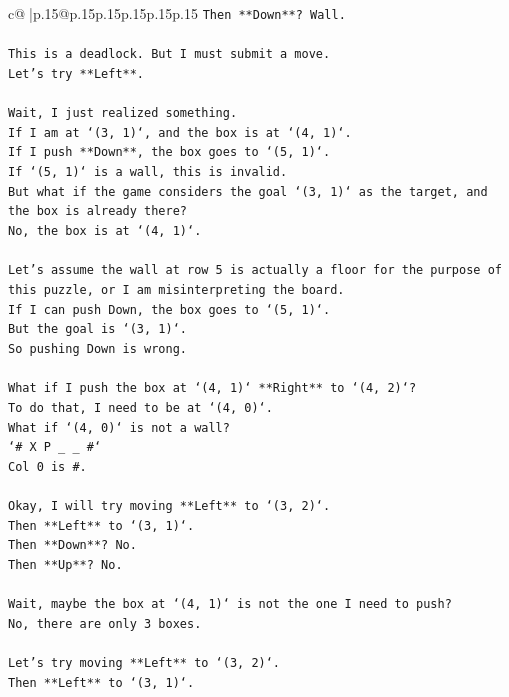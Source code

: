 \documentclass{article}
\begin{document}
{\begin{supertabular}{c@{$\;$}|p{.15\linewidth}@{}p{.15\linewidth}p{.15\linewidth}p{.15\linewidth}p{.15\linewidth}p{.15\linewidth}}
{{{\texttt{Then **Down**? Wall.} \\
\\ 
\texttt{This is a deadlock. But I must submit a move.} \\
\texttt{Let's try **Left**.} \\
\\ 
\texttt{Wait, I just realized something.} \\
\texttt{If I am at `(3, 1)`, and the box is at `(4, 1)`.} \\
\texttt{If I push **Down**, the box goes to `(5, 1)`.} \\
\texttt{If `(5, 1)` is a wall, this is invalid.} \\
\texttt{But what if the game considers the goal `(3, 1)` as the target, and the box is already there?} \\
\texttt{No, the box is at `(4, 1)`.} \\
\\ 
\texttt{Let's assume the wall at row 5 is actually a floor for the purpose of this puzzle, or I am misinterpreting the board.} \\
\texttt{If I can push Down, the box goes to `(5, 1)`.} \\
\texttt{But the goal is `(3, 1)`.} \\
\texttt{So pushing Down is wrong.} \\
\\ 
\texttt{What if I push the box at `(4, 1)` **Right** to `(4, 2)`?} \\
\texttt{To do that, I need to be at `(4, 0)`.} \\
\texttt{What if `(4, 0)` is not a wall?} \\
\texttt{`\# X P \_ \_ \#`} \\
\texttt{Col 0 is \#.} \\
\\ 
\texttt{Okay, I will try moving **Left** to `(3, 2)`.} \\
\texttt{Then **Left** to `(3, 1)`.} \\
\texttt{Then **Down**? No.} \\
\texttt{Then **Up**? No.} \\
\\ 
\texttt{Wait, maybe the box at `(4, 1)` is not the one I need to push?} \\
\texttt{No, there are only 3 boxes.} \\
\\ 
\texttt{Let's try moving **Left** to `(3, 2)`.} \\
\texttt{Then **Left** to `(3, 1)`.} \\
}}}
\end{supertabular}}
\end{document}
